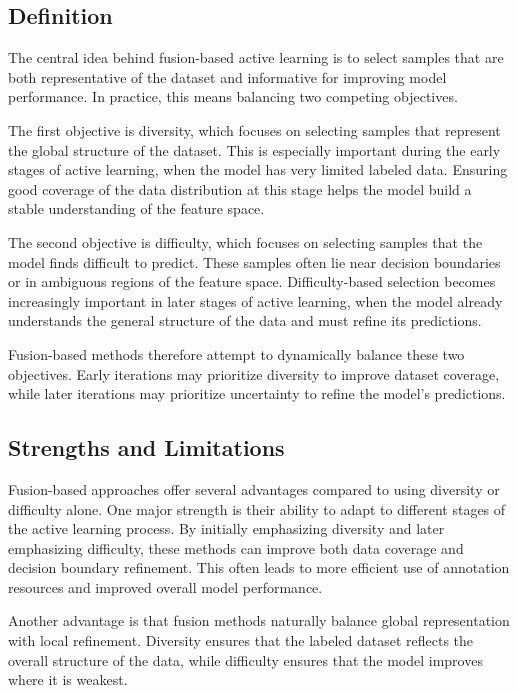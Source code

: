 \documentclass{article}
\begin{document}
\subsection{Definition}

The central idea behind fusion-based active learning is to select samples that are both representative of the dataset and informative for improving model performance. In practice, this means balancing two competing objectives.

The first objective is diversity, which focuses on selecting samples that represent the global structure of the dataset. This is especially important during the early stages of active learning, when the model has very limited labeled data. Ensuring good coverage of the data distribution at this stage helps the model build a stable understanding of the feature space.

The second objective is difficulty, which focuses on selecting samples that the model finds difficult to predict. These samples often lie near decision boundaries or in ambiguous regions of the feature space. Difficulty-based selection becomes increasingly important in later stages of active learning, when the model already understands the general structure of the data and must refine its predictions.

Fusion-based methods therefore attempt to dynamically balance these two objectives. Early iterations may prioritize diversity to improve dataset coverage, while later iterations may prioritize uncertainty to refine the model’s predictions.

\subsection{Strengths and Limitations}

Fusion-based approaches offer several advantages compared to using diversity or difficulty alone. One major strength is their ability to adapt to different stages of the active learning process. By initially emphasizing diversity and later emphasizing difficulty, these methods can improve both data coverage and decision boundary refinement. This often leads to more efficient use of annotation resources and improved overall model performance.

Another advantage is that fusion methods naturally balance global representation with local refinement. Diversity ensures that the labeled dataset reflects the overall structure of the data, while difficulty ensures that the model improves where it is weakest.
\end{document}
